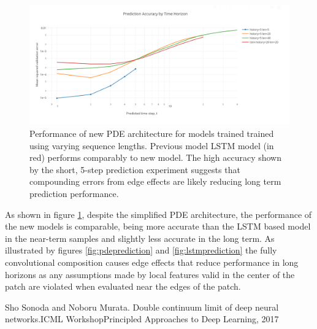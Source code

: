 \documentclass[12pt]{article}
\theoremstyle{plain}
\theoremstyle{remark}
\theoremstyle{definition}
\begin{document}
    \begin{figure}
        \centering
        \includegraphics[width=0.9\linewidth]{pde_perf}
        \caption{\small Performance of new PDE architecture for models trained trained using varying sequence lengths. Previous model LSTM model (in red) performs comparably to new model. The high accuracy shown by the short, 5-step prediction experiment suggests that compounding errors from edge effects are likely reducing long term prediction performance.}
        \label{fig:pdeperf}
    \end{figure}

    As shown in figure \ref{fig:pdeperf}, despite the simplified PDE architecture, the performance of the new models is comparable, being more accurate than the LSTM based model in the near-term samples and slightly less accurate in the long term. As illustrated by figures \ref{fig:pdeprediction} and \ref{fig:lstmprediction} the fully convolutional composition causes edge effects that reduce performance in long horizons as any assumptions made by local features valid in the center of the patch are violated when evaluated near the edges of the patch.

    
    
    Sho Sonoda and Noboru Murata. Double continuum limit of deep neural networks.ICML WorkshopPrincipled Approaches to Deep Learning, 2017
\end{document}
